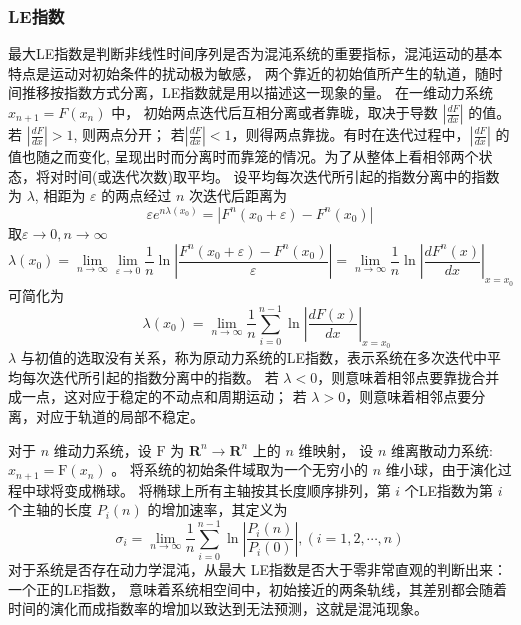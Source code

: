 \subsubsection{LE指数}
最大LE指数是判断非线性时间序列是否为混沌系统的重要指标，混沌运动的基本特点是运动对初始条件的扰动极为敏感，
两个靠近的初始值所产生的轨道，随时间推移按指数方式分离，LE指数就是用以描述这一现象的量。
在一维动力系统 $x_{n+1}=F\left(x_{n}\right)$ 中， 初始两点迭代后互相分离或者靠昽，取决于导数
$\left|\frac{d F}{d x}\right|$ 的值。若 $\left|\frac{d F}{d x}\right|>1$, 则两点分开；
若$\left|\frac{d F}{d x}\right|<1$，则得两点靠拢。有时在迭代过程中，$\left|\frac{d F}{d x}\right|$ 
的值也随之而变化, 呈现出时而分离时而靠笼的情况。为了从整体上看相邻两个状态，将对时间(或迭代次数)取平均。
设平均每次迭代所引起的指数分离中的指数为 $\lambda$, 相距为 $\varepsilon$ 的两点经过 $n$ 次迭代后距离为
\begin{equation}
    \varepsilon e^{n \lambda\left(x_{0}\right)}=\left|F^{n}\left(x_{0}+\varepsilon\right)-F^{n}\left(x_{0}\right)\right|
\end{equation}
取$\varepsilon \rightarrow 0, n \rightarrow \infty$
\begin{equation}
    \lambda\left(x_{0}\right)=\lim _{n \rightarrow \infty} \lim _{\varepsilon \rightarrow 0}
     \frac{1}{n} \ln \left|\frac{F^{n}\left(x_{0}+\varepsilon\right)-F^{n}\left(x_{0}\right)}
     {\varepsilon}\right|=\lim _{n \rightarrow \infty} \frac{1}{n} \ln \left|\frac{d F^{n}(x)}{d x}
     \right|_{x=x_{0}}
\end{equation}
可简化为
\begin{equation}
    \quad \lambda\left(x_{0}\right)=\lim _{n \rightarrow \infty} \frac{1}{n} \sum_{i=0}^{n-1} \ln \left|\frac{d F(x)}{d x}\right|_{x=x_{0}}
\end{equation} 
$\lambda$ 与初值的选取没有关系，称为原动力系统的LE指数，表示系统在多次迭代中平均每次迭代所引起的指数分离中的指数。
若 $\lambda<0$，则意味着相邻点要靠拢合并成一点，这对应于稳定的不动点和周期运动；
若 $\lambda>0$，则意味着相邻点要分离，对应于轨道的局部不稳定。
\par 对于 $n$ 维动力系统，设 $\mathrm{F}$ 为 $\mathbf{R}^{n} \rightarrow \mathbf{R}^{n}$ 上的 $n$ 维映射，
设 $n$ 维离散动力系统: $x_{n+1}=\mathrm{F}\left(x_{n}\right)$ 。
将系统的初始条件域取为一个无穷小的 $n$ 维小球，由于演化过程中球将变成椭球。
将椭球上所有主轴按其长度顺序排列，第 $i$ 个LE指数为第 $i$ 个主轴的长度 $P_{i}(n)$ 的增加速率，其定义为
\begin{equation}
    \sigma_{i}=\lim _{n \rightarrow \infty} \frac{1}{n} \sum_{i=0}^{n-1} \ln \left|\frac{P_{i}(n)}{P_{i}(0)}\right|,(i=1,2, \cdots, n)
\end{equation}
对于系统是否存在动力学混沌，从最大 LE指数是否大于零非常直观的判断出来：一个正的LE指数，
意味着系统相空间中，初始接近的两条轨线，其差别都会随着时间的演化而成指数率的增加以致达到无法预测，这就是混沌现象。
